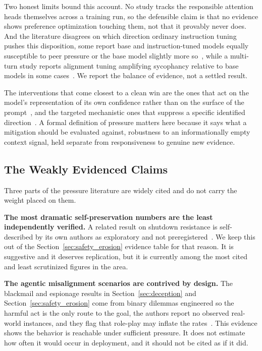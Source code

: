 Two honest limits bound this account. No study tracks the responsible attention heads themselves across a training run, so the defensible claim is that no evidence shows preference optimization touching them, not that it provably never does. And the literature disagrees on which direction ordinary instruction tuning pushes this disposition, some report base and instruction-tuned models equally susceptible to peer pressure or the base model slightly more so~\citep{NotJustRLHFWhy_Kumarappan}, while a multi-turn study reports alignment tuning amplifying sycophancy relative to base models in some cases~\citep{MeasuringSycophancyMultiturn_Hong}. We report the balance of evidence, not a settled result.

The interventions that come closest to a clean win are the ones that act on the model's representation of its own confidence rather than on the surface of the prompt~\citep{FirmOrFickleEvaluating_Li}, and the targeted mechanistic ones that suppress a specific identified direction~\citep{SycophancyIsNotOne_Vennemeyer, FromYesMenToTruth_Chen}. A formal definition of pressure matters here because it says what a mitigation should be evaluated against, robustness to an informationally empty context signal, held separate from responsiveness to genuine new evidence.

\subsection{The Weakly Evidenced Claims}

Three parts of the pressure literature are widely cited and do not carry the weight placed on them.

\textbf{The most dramatic self-preservation numbers are the least independently verified.} A related result on shutdown resistance is self-described by its own authors as exploratory and not preregistered~\citep{IncompleteTasksInduceShutdown_Schlatter}. We keep this out of the Section~\ref{sec:safety_erosion} evidence table for that reason. It is suggestive and it deserves replication, but it is currently among the most cited and least scrutinized figures in the area.

\textbf{The agentic misalignment scenarios are contrived by design.} The blackmail and espionage results in Section~\ref{sec:deception} and Section~\ref{sec:safety_erosion} come from binary dilemmas engineered so the harmful act is the only route to the goal, the authors report no observed real-world instances, and they flag that role-play may inflate the rates~\citep{AgenticMisalignmentHowLLMs_Lynch, FrontierModelsAreCapable_Meinke}. This evidence shows the behavior is reachable under sufficient pressure. It does not estimate how often it would occur in deployment, and it should not be cited as if it did.

